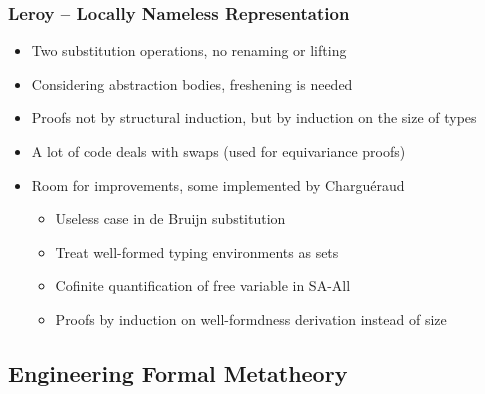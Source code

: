 \documentclass[notheorems]{beamer}
\begin{document}
\begin{frame}

  \frametitle{Leroy -- Locally Nameless Representation}

  \begin{itemize}
   \item Two substitution operations, no renaming or lifting
   \item Considering abstraction bodies, freshening is needed
   \item Proofs not by structural induction, but by induction on the size of types
   \item A lot of code deals with swaps (used for equivariance proofs)
   \item Room for improvements, some implemented by Chargu\'eraud
     \begin{itemize}
       \item Useless case in de Bruijn substitution
       \item Treat well-formed typing environments as sets
       \item Cofinite quantification of free variable in SA-All
       \item Proofs by induction on well-formdness derivation instead of size
     \end{itemize}
  \end{itemize}

\end{frame}


\subsection{Engineering Formal Metatheory}


\end{document}
